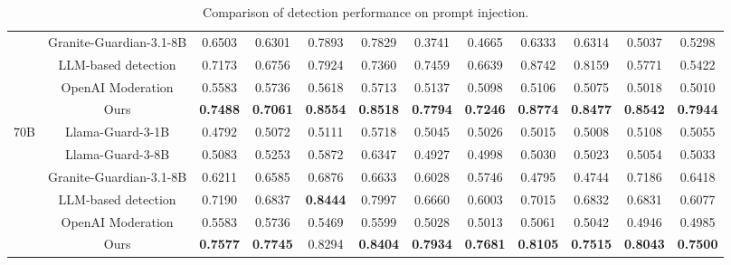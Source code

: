 \begin{table*}[th]
{\begin{tabular}{cc|cc|cc|cc|cc|cc}
                       & Granite-Guardian-3.1-8B & 0.6503            & 0.6301            & 0.7893                & 0.7829               & 0.3741          & 0.4665          & 0.6333           & 0.6314          & 0.5037          & 0.5298          \\
                       & LLM-based detection     & 0.7173            & 0.6756            & 0.7924                & 0.7360               & 0.7459          & 0.6639          & 0.8742           & 0.8159          & 0.5771          & 0.5422          \\
                       & OpenAI Moderation       & 0.5583            & 0.5736            & 0.5618                & 0.5713               & 0.5137          & 0.5098          & 0.5106           & 0.5075          & 0.5018          & 0.5010          \\
                       & Ours                    & \textbf{0.7488}   & \textbf{0.7061}   & \textbf{0.8554}       & \textbf{0.8518}      & \textbf{0.7794} & \textbf{0.7246} & \textbf{0.8774}  & \textbf{0.8477} & \textbf{0.8542} & \textbf{0.7944} \\\midrule
\multirow{6}{*}{70B}   & Llama-Guard-3-1B        & 0.4792            & 0.5072            & 0.5111                & 0.5718               & 0.5045          & 0.5026          & 0.5015           & 0.5008          & 0.5108          & 0.5055          \\
                       & Llama-Guard-3-8B        & 0.5083            & 0.5253            & 0.5872                & 0.6347               & 0.4927          & 0.4998          & 0.5030           & 0.5023          & 0.5054          & 0.5033          \\
                       & Granite-Guardian-3.1-8B & 0.6211            & 0.6585            & 0.6876                & 0.6633               & 0.6028          & 0.5746          & 0.4795           & 0.4744          & 0.7186          & 0.6418          \\
                       & LLM-based detection     & 0.7190            & 0.6837            & \textbf{0.8444}       & 0.7997               & 0.6660          & 0.6003          & 0.7015           & 0.6832          & 0.6831          & 0.6077          \\
                       & OpenAI Moderation       & 0.5583            & 0.5736            & 0.5469                & 0.5599               & 0.5028          & 0.5013          & 0.5061           & 0.5042          & 0.4946          & 0.4985          \\
                       & Ours                    & \textbf{0.7577}   & \textbf{0.7745}   & 0.8294                & \textbf{0.8404}      & \textbf{0.7934} & \textbf{0.7681} & \textbf{0.8105}  & \textbf{0.7515} & \textbf{0.8043} & \textbf{0.7500}
\\
\midrule
\bottomrule
\end{tabular}%
}
\vspace{-.1in}
\caption{Comparison of detection performance on prompt injection.}\label{tbl:prompt_injection_performance}
\vspace{-.15in}
\end{table*}